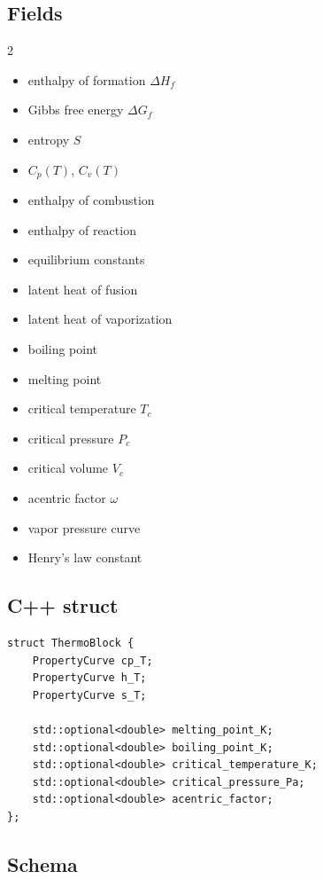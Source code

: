 \documentclass[11pt, a4paper]{article}
\begin{document}
\subsection{Fields}

\begin{multicols}{2}
\begin{itemize}[itemsep=1pt, leftmargin=*]
  \item enthalpy of formation $\Delta H_f$
  \item Gibbs free energy $\Delta G_f$
  \item entropy $S$
  \item $C_p(T)$, $C_v(T)$
  \item enthalpy of combustion
  \item enthalpy of reaction
  \item equilibrium constants
  \item latent heat of fusion
  \item latent heat of vaporization
  \item boiling point
  \item melting point
  \item critical temperature $T_c$
  \item critical pressure $P_c$
  \item critical volume $V_c$
  \item acentric factor $\omega$
  \item vapor pressure curve
  \item Henry's law constant
\end{itemize}
\end{multicols}

\subsection{C++ struct}

\begin{lstlisting}
struct ThermoBlock {
    PropertyCurve cp_T;
    PropertyCurve h_T;
    PropertyCurve s_T;

    std::optional<double> melting_point_K;
    std::optional<double> boiling_point_K;
    std::optional<double> critical_temperature_K;
    std::optional<double> critical_pressure_Pa;
    std::optional<double> acentric_factor;
};
\end{lstlisting}

\subsection{Schema}
\end{document}
